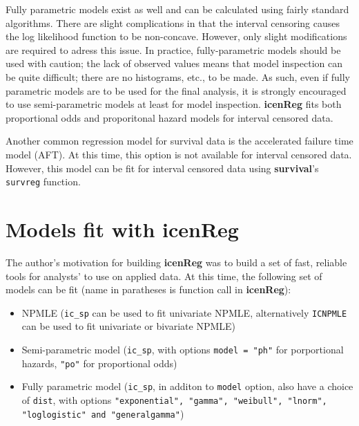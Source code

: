 \documentclass[11pt]{report}
\begin{document}
  Fully parametric models exist as well and can be calculated using fairly standard
  algorithms. There are slight complications in that the interval censoring causes the log
  likelihood function to be non-concave. However, only slight modifications are required to 
  adress this issue. In practice, fully-parametric models should be used with caution; the
  lack of observed values means that model inspection can be quite difficult; there are no
  histograms, etc., to be made. As such, even if fully parametric models are to be used for
  the final analysis, it is strongly encouraged to use semi-parametric models at least for
  model inspection. {\bf icenReg} fits both proportional odds and proporitonal hazard models for interval
  censored data. 
  
  Another common regression model for survival data is the accelerated failure time model (AFT).
  At this time, this option is not available for interval censored data. However, this model
  can be fit for interval censored data using {\bf survival}'s \texttt{survreg} function. 
  
\section{Models fit with {\bf{icenReg}} }

  The author's motivation for building {\bf{icenReg}} was to build a set of fast, reliable
  tools for analysts' to use on applied data. At this time, the following set of models can 
  be fit (name in paratheses is function call in {\bf{icenReg}}):
  
  \begin{itemize}
  
    \item NPMLE (\texttt{ic\_sp} can be used to fit univariate NPMLE, alternatively \texttt{ICNPMLE} can be used to fit univariate or bivariate NPMLE)
  
    \item Semi-parametric model (\texttt{ic\_sp}, with options \texttt{model = "ph"} for 
    porportional hazards, \texttt{"po"} for proportional odds)
    
    \item Fully parametric model (\texttt{ic\_sp}, in additon to \texttt{model} option, also 
    have a choice of \texttt{dist}, with options \texttt{"exponential", "gamma", "weibull", "lnorm", "loglogistic" and "generalgamma"})
  
  \end{itemize}
  
\end{document}
